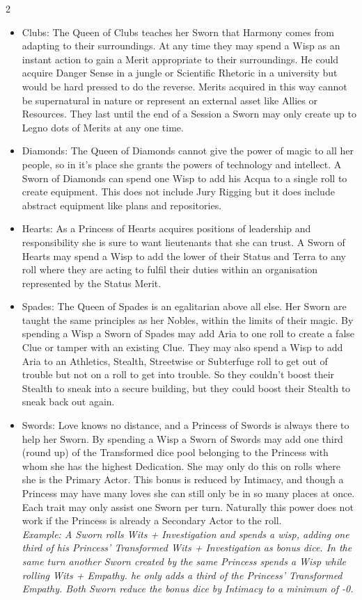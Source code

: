 \begin{multicols}{2}
\begin{itemize}
\item Clubs: The Queen of Clubs teaches her Sworn that Harmony comes from adapting to their surroundings. At any time they may spend a Wisp as an instant action to gain a Merit appropriate to their surroundings. He could acquire Danger Sense in a jungle or Scientific Rhetoric in a university but would be hard pressed to do the reverse. Merits acquired in this way cannot be supernatural in nature or represent an external asset like Allies or Resources. They last until the end of a Session a Sworn may only create up to Legno dots of Merits at any one time. 
\item Diamonds: The Queen of Diamonds cannot give the power of magic to all her people, so in it's place she grants the powers of technology and intellect. A Sworn of Diamonds can spend one Wisp to add his Acqua to a single roll to create equipment. This does not include Jury Rigging but it does include abstract equipment like plans and repositories.
\item Hearts: As a Princess of Hearts acquires positions of leadership and responsibility she is sure to want lieutenants that she can trust. A Sworn of Hearts may spend a Wisp to add the lower of their Status and Terra to any roll where they are acting to fulfil their duties within an organisation represented by the Status Merit. 
\item Spades: The Queen of Spades is an egalitarian above all else. Her Sworn are taught the same principles as her Nobles, within the limits of their magic. By spending a Wisp a Sworn of Spades may add Aria to one roll to create a false Clue or tamper with an existing Clue. They may also spend a Wisp to add Aria to an Athletics, Stealth, Streetwise or Subterfuge roll to get out of trouble but not on a roll to get into trouble. So they couldn't boost their Stealth to sneak into a secure building, but they could boost their Stealth to sneak back out again. 
\item Swords: Love knows no distance, and a Princess of Swords is always there to help her Sworn. By spending a Wisp a Sworn of Swords may add one third (round up) of the Transformed dice pool belonging to the Princess with whom she has the highest Dedication. She may only do this on rolls where she is the Primary Actor. This bonus is reduced by Intimacy, and though a Princess may have many loves she can still only be in so many places at once. Each trait may only assist one Sworn per turn. Naturally this power does not work if the Princess is already a Secondary Actor to the roll. \\ \textit{Example: A Sworn rolls Wits + Investigation and spends a wisp, adding one third of his Princess' Transformed Wits + Investigation as bonus dice. In the same turn another Sworn created by the same Princess spends a Wisp while rolling Wits + Empathy. he only adds a third of the Princess' Transformed Empathy. Both Sworn reduce the bonus dice by Intimacy to a minimum of -0.}

\end{itemize}
\end{multicols}
